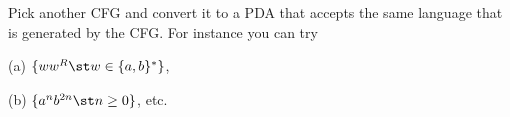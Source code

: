 Pick another CFG and convert it to a PDA that accepts the same language that is
generated by the CFG. 
For instance you can try
\begin{tightlist}
  \item[(a)] $\{ww^R \st w \in \{a, b\}^*\}$, 
  \item[(b)] $\{a^n b^{2n} \st n \geq 0 \}$, etc.
\end{tightlist}

